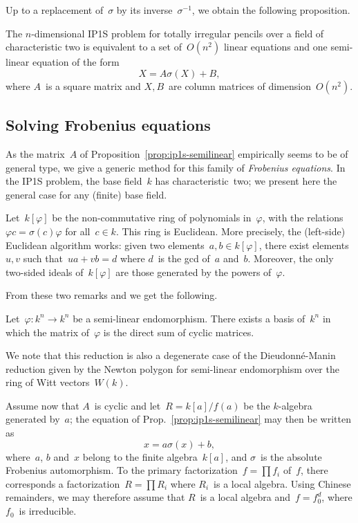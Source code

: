 \documentclass{lms}
\begin{document}
Up to a replacement of~$σ$ by its inverse~$σ^{-1}$, we obtain the
following proposition.

\begin{prop}\label{prop:ip1s-semilinear}
The $n$-dimensional IP1S problem for totally irregular pencils over a
field of characteristic two is equivalent to a set of~$O(n^2)$ linear
equations and one semi-linear equation of the form
\begin{equation*}
X = A σ(X) + B,
\end{equation*}
where $A$~is a square matrix and $X, B$~are column matrices of
dimension~$O(n^2)$.
\end{prop}

\subsection{Solving Frobenius equations}

As the matrix~$A$ of Proposition~\ref{prop:ip1s-semilinear}
empirically seems to be of general type,
we give a generic method for this family of \emph{Frobenius equations}.
In the IP1S problem, the base field~$k$ has characteristic~two; we
present here the general case for any (finite) base field.

Let~$k[φ]$ be the non-commutative ring of polynomials in~$φ$,
with the relations~$φ c = σ(c) φ$ for all~$c ∈ k$. This ring is Euclidean.
More precisely, the (left-side) Euclidean algorithm works:
given two elements~$a, b ∈ k[φ]$, there exist elements~$u, v$
such that~$u a + v b = d$ where $d$~is the gcd of~$a$ and~$b$.
Moreover, the only two-sided ideals of~$k[φ]$
are those generated by the powers of~$φ$.

From these two remarks and \cite[Ch.~3, Th.~19]{jacobson1943rings} we get
the following.
\begin{thm}
Let~$φ: k^n → k^n$ be a semi-linear endomorphism. There exists a basis
of~$k^n$ in which the matrix of~$φ$ is the direct sum of cyclic matrices.
\end{thm}
We note that this reduction is also a degenerate case of
the Dieudonné-Manin reduction given by the Newton polygon
for semi-linear endomorphism over the ring of Witt vectors~$W(k)$.


Assume now that $A$~is cyclic and let~$R = k[a]/f(a)$ be the $k$-algebra
generated by~$a$; the equation of Prop.~\eqref{prop:ip1s-semilinear} may
then be written as
\begin{equation}\label{eq:semi-linear-pol}
x = a σ(x) + b,
\end{equation}
where~$a$, $b$ and~$x$ belong to the finite algebra~$k[a]$, and $σ$~is
the absolute Frobenius automorphism. To the primary factorization~$f = ∏
f_i$ of~$f$, there corresponds a factorization~$R = ∏ R_i$ where $R_i$~is
a local algebra. Using Chinese remainders, we may therefore assume that
$R$~is a local algebra and~$f = f_0^d$, where $f_0$~is irreducible.
\end{document}
